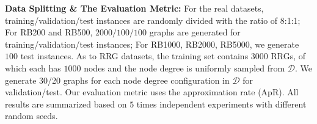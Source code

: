 \textbf{Data Splitting \& The Evaluation Metric:} For the real datasets, training/validation/test instances are randomly divided with the ratio of 8:1:1; For RB200 and RB500, $2000/100/100$ graphs are generated for training/validation/test instances; For RB1000, RB2000, RB5000, we generate $100$ test instances. As to RRG datasets, the training set contains $3000$ RRGs, of which each has $1000$ nodes and the node degree is uniformly sampled from $\mathcal{D}$. We generate 30/20 graphs for each node degree configuration in $\mathcal{D}$ for validation/test. Our evaluation metric uses the approximation rate (ApR). All results are summarized based on $5$ times independent experiments with different random seeds.%


